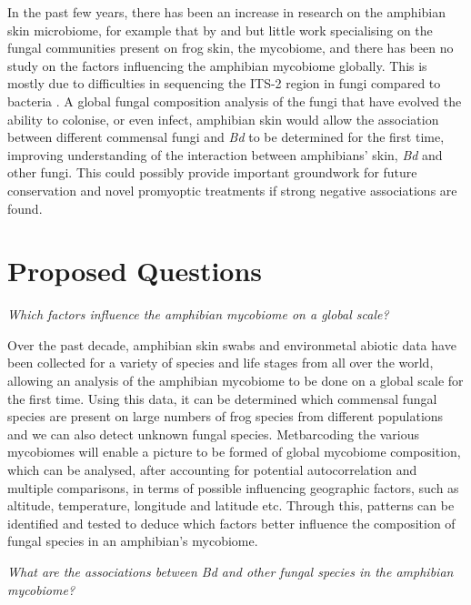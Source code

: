 \documentclass[11pt, a4paper, titlepage]{article}
\begin{document}
\noindent In the past few years, there has been an increase in research on the amphibian skin microbiome, for example that by \parencite{Bates2018} and \parencite{Bates2019} but little work specialising on the fungal communities present on frog skin, the mycobiome, and there has been no study on the factors influencing the amphibian mycobiome globally. This is mostly due to difficulties in sequencing the ITS-2 region in fungi compared to bacteria \parencite{Tipton2017}. A global fungal composition analysis of the fungi that have evolved the ability to colonise, or even infect, amphibian skin would allow the association between different commensal fungi and \textit{Bd} to be determined for the first time, improving understanding of the interaction between amphibians' skin, \textit{Bd} and other fungi. This could possibly provide important groundwork for future conservation and novel promyoptic treatments if strong negative associations are found.

\section{Proposed Questions}

\noindent\textit{Which factors influence the amphibian mycobiome on a global scale?} \newline

\noindent Over the past decade, amphibian skin swabs and environmetal abiotic data have been collected for a variety of species and life stages from all over the world, allowing an analysis of the amphibian mycobiome to be done on a global scale for the first time. Using this data, it can be determined which commensal fungal species are present on large numbers of frog species from different populations and we can also detect unknown fungal species. Metbarcoding the various mycobiomes will enable a picture to be formed of global mycobiome composition, which can be analysed, after accounting for potential autocorrelation and multiple comparisons, in terms of possible influencing geographic factors, such as altitude, temperature, longitude and latitude etc. Through this, patterns can be identified and tested to deduce which factors better influence the composition of fungal species in an amphibian's mycobiome. \newline

\noindent \textit{What are the associations between \textit{Bd} and other fungal species in the amphibian mycobiome?}  \newline
\end{document}

